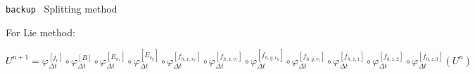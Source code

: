 \documentclass{beamer}
\newcommand{\backupend}{
  \setcounter{framenumber}{\value{finalframe}}
}
\newenvironment{bframe}[1]%
{%
  \begin{frame}{{\small\texttt{backup}\ } #1}
}%
{%
  \end{frame}
}
\begin{document}
\begin{bframe}{Splitting method}
  For Lie method:

  $U^{n+1} = \varphi_{\Delta t}^{[j_c]}
        \circ\varphi_{\Delta t}^{[B]}
        \circ\varphi_{\Delta t}^{[E_{v_x}]}
        \circ\varphi_{\Delta t}^{[E_{v_y}]}
        \circ\varphi_{\Delta t}^{[f_{h,x,v_x}]}
        \circ\varphi_{\Delta t}^{[f_{h,x,v_z}]}
        \circ\varphi_{\Delta t}^{[f_{h,y,v_y}]}
        \circ\varphi_{\Delta t}^{[f_{h,y,v_z}]}
        \circ\varphi_{\Delta t}^{[f_{h,z,1}]}
        \circ\varphi_{\Delta t}^{[f_{h,z,2}]}
        \circ\varphi_{\Delta t}^{[f_{h,z,3}]}
        (U^n)
   $
\end{bframe}


\backupend
\end{document}
